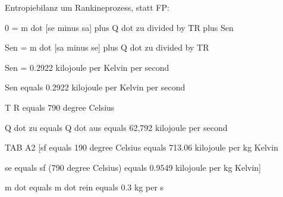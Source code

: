 Entropiebilanz um Rankineprozess, statt FP:

0 = m dot [se minus sa] plus Q dot zu divided by TR plus Sen

Sen = m dot [sa minus se] plus Q dot zu divided by TR

Sen = 0.2922 kilojoule per Kelvin per second

Sen equals 0.2922 kilojoule per Kelvin per second

T R equals 790 degree Celsius

Q dot zu equals Q dot aus equals 62,792 kilojoule per second

TAB A2 [sf equals 190 degree Celsius equals 713.06 kilojoule per kg Kelvin

se equals sf (790 degree Celsius) equals 0.9549 kilojoule per kg Kelvin]

m dot equals m dot rein equals 0.3 kg per s